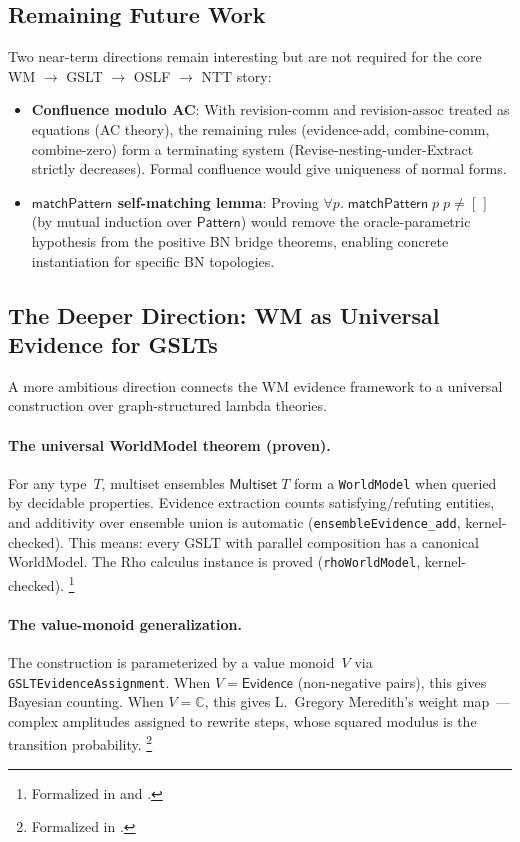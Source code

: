 \documentclass[11pt,openany]{report}
\begin{document}
\subsection{Remaining Future Work}

Two near-term directions remain interesting but are not required for the
core WM $\to$ GSLT $\to$ OSLF $\to$ NTT story:

\begin{itemize}
\item \textbf{Confluence modulo AC}:
  With revision-comm and revision-assoc treated as equations
  (AC theory), the remaining rules (evidence-add, combine-comm,
  combine-zero) form a terminating system (Revise-nesting-under-Extract
  strictly decreases).  Formal confluence would give uniqueness of
  normal forms.

\item \textbf{$\mathsf{matchPattern}$ self-matching lemma}:
  Proving $\forall p.\; \mathsf{matchPattern}\;p\;p \ne [\,]$
  (by mutual induction over $\mathsf{Pattern}$) would remove the
  oracle-parametric hypothesis from the positive BN bridge theorems,
  enabling concrete instantiation for specific BN topologies.
\end{itemize}

\subsection{The Deeper Direction: WM as Universal Evidence for GSLTs}

A more ambitious direction connects the WM evidence framework to a
universal construction over graph-structured lambda theories.

\paragraph{The universal WorldModel theorem (proven).}
For any type~$T$, multiset ensembles $\mathsf{Multiset}\;T$ form
a \texttt{WorldModel} when queried by decidable properties.  Evidence
extraction counts satisfying/refuting entities, and additivity over
ensemble union is automatic (\texttt{ensembleEvidence\_add},
kernel-checked).  This means: every GSLT with parallel composition
has a canonical WorldModel.  The Rho calculus instance is proved
(\texttt{rhoWorldModel}, kernel-checked).%
\footnote{Formalized in 
  and .}

\paragraph{The value-monoid generalization.}
The construction is parameterized by a value monoid~$V$ via
\texttt{GSLTEvidenceAssignment}.  When $V = \mathsf{Evidence}$
(non-negative pairs), this gives Bayesian counting.  When
$V = \mathbb{C}$, this gives L.~Gregory Meredith's weight
map~\cite{MeredithCCC2026}---complex amplitudes assigned to
rewrite steps, whose squared modulus is the transition probability.%
\footnote{Formalized in .}
\end{document}

